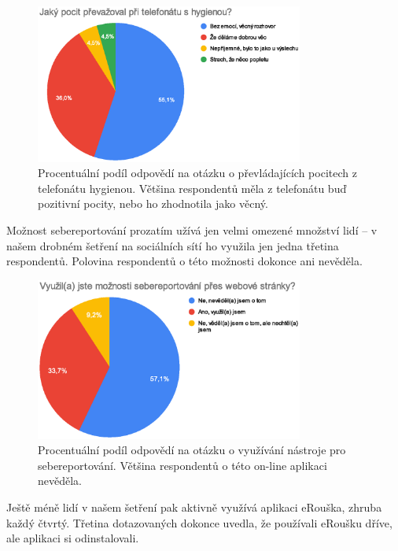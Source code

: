 \begin{figure}
\begin{center}
    \includegraphics[width=250pt]{./pic/graf1.eps}
\end{center}    

\caption{Procentuální podíl odpovědí na otázku o převládajících pocitech z telefonátu  hygienou. Většina respondentů měla z telefonátu buď pozitivní pocity, nebo ho zhodnotila jako věcný.}
 
 \end{figure}

Možnost sebereportování prozatím užívá jen velmi omezené množství lidí – v našem drobném šetření na sociálních sítí ho využila jen jedna třetina respondentů. Polovina respondentů o této možnosti dokonce ani nevěděla. 

\begin{figure}
\begin{center}
    \includegraphics[width=250pt]{./pic/graf2.eps}
 \end{center}    
    \caption{Procentuální podíl odpovědí na otázku o využívání nástroje pro sebereportování. Většina respondentů o této on-line aplikaci nevěděla.}
\end{figure}

Ještě méně lidí v našem šetření pak aktivně využívá aplikaci eRouška, zhruba každý čtvrtý. Třetina dotazovaných dokonce uvedla, že používali eRoušku dříve, ale aplikaci si odinstalovali.

